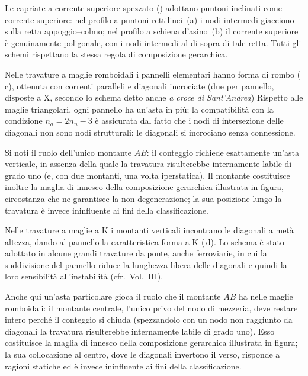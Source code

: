 Le capriate a corrente superiore spezzato
() adottano puntoni
inclinati come corrente superiore: nel profilo a
puntoni rettilinei~(a) i nodi intermedi giacciono
sulla retta appoggio--colmo; nel profilo a schiena
d'asino~(b) il corrente superiore è genuinamente
poligonale, con i nodi intermedi al di sopra di
tale retta.
Tutti gli schemi rispettano la stessa regola di
composizione gerarchica.












Nelle travature a maglie romboidali i pannelli
elementari hanno forma di rombo
(\,c), ottenuta con
correnti paralleli e diagonali incrociate (due per
pannello, disposte a X, secondo lo schema detto
anche \emph{a croce di Sant'Andrea})
Rispetto alle
maglie triangolari, ogni pannello ha un'asta in più;
la compatibilità con la condizione $n_a = 2n_n - 3$
è assicurata dal fatto che i nodi di intersezione
delle diagonali non sono nodi strutturali: le diagonali
si incrociano senza connessione.

Si noti il ruolo dell'unico montante $AB$: il
conteggio richiede esattamente un'asta verticale,
in assenza della quale la travatura risulterebbe
internamente labile di grado uno (e, con due
montanti, una volta iperstatica). Il montante
costituisce inoltre la maglia di innesco della
composizione gerarchica illustrata in figura,
circostanza che ne garantisce la non degenerazione;
la sua posizione lungo la travatura è invece
ininfluente ai fini della classificazione.

Nelle travature a maglie a K i montanti verticali
incontrano le diagonali a metà altezza, dando al
pannello la caratteristica forma a K
(\,d). Lo schema è
stato adottato in alcune grandi travature da ponte,
anche ferroviarie, in cui la suddivisione del
pannello riduce la lunghezza libera delle diagonali
e quindi la loro sensibilità all'instabilità
(cfr.~Vol.~III).

Anche qui un'asta particolare gioca il ruolo che
il montante $AB$ ha nelle maglie romboidali: il
montante centrale, l'unico privo del nodo di
mezzeria, deve restare intero perché il conteggio
si chiuda (spezzandolo con un nodo non raggiunto
da diagonali la travatura risulterebbe internamente
labile di grado uno). Esso costituisce la maglia
di innesco della composizione gerarchica illustrata
in figura; la sua collocazione al centro, dove le
diagonali invertono il verso, risponde a ragioni
statiche ed è invece ininfluente ai fini della
classificazione.

